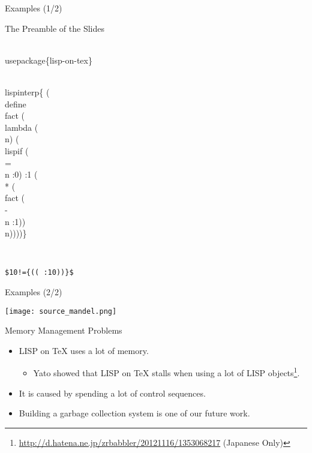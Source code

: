 \documentclass[pdftex,10pt,c,compress]{beamer}
\begin{document}
  \begin{frame}[t, fragile]{Examples (1/2)}
      \begin{footnotesize}
        \begin{block}{The Preamble of the Slides}\vspace{-\baselineskip}
\begin{semiverbatim}
\\usepackage\{lisp-on-tex\}

\\lispinterp\{
  (\\define \\fact
    (\\lambda (\\n)
      (\\lispif (\\= \\n :0) :1
        (\\* (\\fact (\\- \\n :1)) \\n))))\}        
\end{semiverbatim}\vspace{-\baselineskip}
        \end{block}
      \end{footnotesize}
      \mbox{}\\
        \strut{}%
          {\footnotesize
            \texttt{\$10!=\string\lispinterp\{(\string\texprint (\string
              \fact :10))\}\$}}
        \begin{center}\color{red}\Large
        \end{center}
\end{frame}

  \begin{frame}{Examples (2/2)}
    \begin{center}
        {\texttt{[image: source\_mandel.png]}}
    \end{center}
  \end{frame}


  \begin{frame}{Memory Management Problems}
    \begin{itemize}
      \item LISP on \TeX{} uses a lot of memory.
      \begin{itemize}
        \item Yato showed that LISP on \TeX{} stalls
          when using a lot of LISP objects\footnote{%
            \url{http://d.hatena.ne.jp/zrbabbler/20121116/1353068217} (Japanese Only)}.
      \end{itemize}
      \item It is caused by spending a lot of control sequences.
      \item Building a garbage collection system is one of our future work.
    \end{itemize}
  \end{frame}
\end{document}
